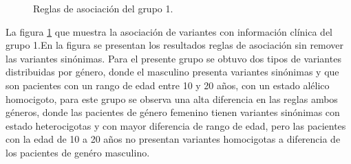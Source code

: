 \begin{figure}[h!]
	\centering
	\caption{Reglas de asociación del grupo 1.}
	\label{fig:reglas1}
\end{figure}

La figura \ref{fig:reglas1} que muestra la asociación de variantes con información clínica del grupo 1.En la figura \label{fig:re1} se presentan los resultados reglas de asociación sin remover las variantes sinónimas. Para el presente grupo se obtuvo dos tipos de variantes  distribuidas por género, donde el masculino presenta variantes  sinónimas y que son pacientes con un rango de edad entre 10 y 20 años, con un estado alélico homocigoto, para este grupo se observa una alta diferencia en las reglas ambos géneros, donde las pacientes de género femenino tienen variantes sinónimas con estado heterocigotas y con mayor diferencia de rango  de edad, pero las pacientes con la edad de 10 a 20 años no presentan variantes homocigotas a diferencia de los pacientes de genéro masculino.\\

